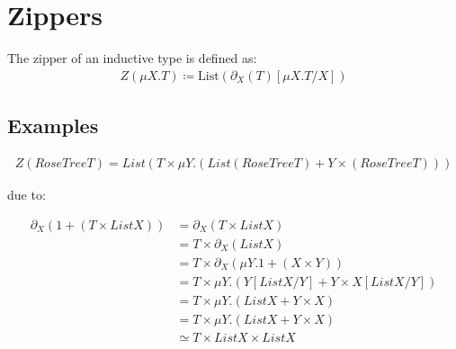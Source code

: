 \documentclass{article}
\begin{document}
\section{Zippers}
The zipper of an inductive type is defined as:
\begin{align*}
  Z(\mu X.T) \coloneqq \text{List}(\partial_X(T)[\mu X.T/X])
\end{align*}

\subsection{Examples}

\begin{align*}
  Z(RoseTree T) = List  (T \times \mu Y.(List (RoseTree T) + Y \times (RoseTree T)))
\end{align*}

due to:

\begin{align*}
  \partial_X(1 + (T \times List X)) &= \partial_X(T \times List X) \\
  &= T \times \partial_X(List X) \\
  &= T \times \partial_X(\mu Y. 1 + (X \times Y)) \\
  &= T \times \mu Y.(Y[List X/Y] + Y \times X[List X /Y]) \\
  &= T \times \mu Y.(List X + Y \times X) \\
  &= T \times \mu Y.(List X + Y \times X) \\
  &\simeq T \times List X \times List X
\end{align*}
\end{document}

